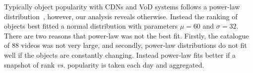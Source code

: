Typically object popularity with CDNs and VoD systems follows a power-law distribution~\cite{chesire2001maa,almeida2001aem,yu2006uub}, however, our analysis reveals otherwise. Instead the ranking of objects best fitted a normal distribution with parameters $\mu = 60$ and $\sigma = 32$. There are two reasons that power-law was not the best fit. Firstly, the catalogue of 88 videos was not very large, and secondly, power-law distributions do not fit well if the objects are constantly changing. Instead power-law fits better if a snapshot of rank \emph{vs.} popularity is taken each day and aggregated.





